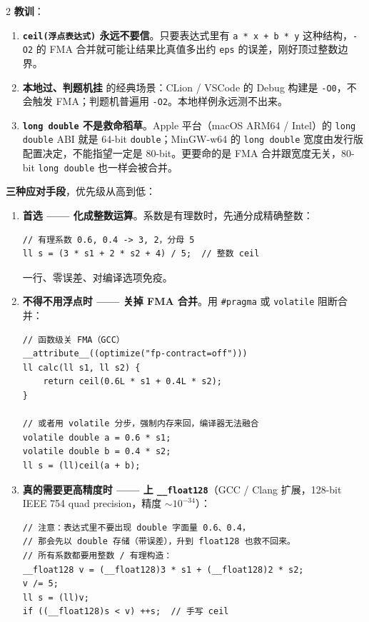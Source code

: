 \begin{multicols*}{2}
		\textbf{教训}：

		\begin{enumerate}

			\item \textbf{\texttt{ceil(浮点表达式)} 永远不要信}。只要表达式里有 \texttt{a * x + b * y} 这种结构，\texttt{-O2} 的 FMA 合并就可能让结果比真值多出约 \texttt{eps} 的误差，刚好顶过整数边界。
			\item \textbf{本地过、判题机挂} 的经典场景：CLion / VSCode 的 Debug 构建是 \texttt{-O0}，不会触发 FMA；判题机普遍用 \texttt{-O2}。本地样例永远测不出来。
			\item \textbf{\texttt{long double} 不是救命稻草}。Apple 平台（macOS ARM64 / Intel）的 \texttt{long double} ABI 就是 64-bit \texttt{double}；MinGW-w64 的 \texttt{long double} 宽度由发行版配置决定，不能指望一定是 80-bit。更要命的是 FMA 合并跟宽度无关，80-bit \texttt{long double} 也一样会被合并。
		\end{enumerate}

		\textbf{三种应对手段}，优先级从高到低：

		\begin{enumerate}
			\item \textbf{首选 —— 化成整数运算}。系数是有理数时，先通分成精确整数：

			\begin{verbatim}
// 有理系数 0.6, 0.4 -> 3, 2，分母 5
ll s = (3 * s1 + 2 * s2 + 4) / 5;  // 整数 ceil
			\end{verbatim}

			一行、零误差、对编译选项免疫。

			\item \textbf{不得不用浮点时 —— 关掉 FMA 合并}。用 \texttt{\#pragma} 或 \texttt{volatile} 阻断合并：

			\begin{verbatim}
// 函数级关 FMA（GCC）
__attribute__((optimize("fp-contract=off")))
ll calc(ll s1, ll s2) {
    return ceil(0.6L * s1 + 0.4L * s2);
}

// 或者用 volatile 分步，强制内存来回，编译器无法融合
volatile double a = 0.6 * s1;
volatile double b = 0.4 * s2;
ll s = (ll)ceil(a + b);
			\end{verbatim}

			\item \textbf{真的需要更高精度时 —— 上 \texttt{\_\_float128}}（GCC / Clang 扩展，128-bit IEEE 754 quad precision，精度 $\sim 10^{-34}$）：

			\begin{verbatim}
// 注意：表达式里不要出现 double 字面量 0.6、0.4，
// 那会先以 double 存储（带误差），升到 float128 也救不回来。
// 所有系数都要用整数 / 有理构造：
__float128 v = (__float128)3 * s1 + (__float128)2 * s2;
v /= 5;
ll s = (ll)v;
if ((__float128)s < v) ++s;  // 手写 ceil
			\end{verbatim}


\end{enumerate}
\end{multicols*}
